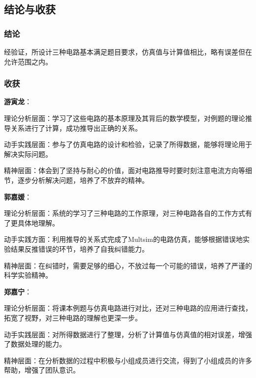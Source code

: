 \documentclass[./测控三级项目.tex]{subfiles} %
\begin{document}
			
	
	
	\subsection{结论与收获}
		\subsubsection{结论}
		经验证，所设计三种电路基本满足题目要求，仿真值与计算值相比，略有误差但在允许范围之内。
		\subsubsection{收获}
		\textbf{游寅龙}：\par
		理论分析层面：学习了这些电路的基本原理及其背后的数学模型，对例题的理论推导关系进行了计算，成功推导出正确的关系。\par
		动手实践层面：参与了仿真电路的设计和检验，记录了所得数据，能够将理论用于解决实际问题。\par
		精神层面：体会到了坚持与耐心的价值，面对电路推导时要时刻注意电流方向等细节，逐步分析解决问题，培养了不放弃的精神。\par
		\textbf{郭嘉媛}：\par
		理论分析层面：系统的学习了三种电路的工作原理，对三种电路各自的工作方式有了更具体地理解。\par
		动手实践方面：利用推导的关系式完成了Multsim的电路仿真，能够根据错误地实验结果反推错误的环节，培养了自我纠错能力。\par
		精神层面：在纠错时，需要足够的细心，不放过每一个可能的错误，培养了严谨的科学实验精神。\par
		\textbf{郑嘉宁}：\par
		理论分析层面：将课本例题与仿真电路进行对比，还对三种电路的应用进行查找，拓宽了视野，对三种电路的理解也更深一步。\par
		动手实践层面：对所得数据进行了整理，分析了计算值与仿真值的相对误差，增强了数据处理的能力。\par
		精神层面：在分析数据的过程中积极与小组成员进行交流，得到了小组成员的许多帮助，增强了团队意识。\par
		
		
	
	
\end{document}
